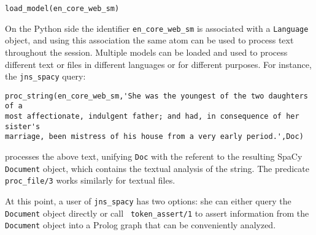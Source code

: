 \begin{verbatim}
load_model(en_core_web_sm) 
\end{verbatim}

\noindent
On the Python side the identifier {\tt en\_core\_web\_sm} is
associated with a {\tt Language} object, and using this
association the same atom can be used to process text throughout the
session.  Multiple models can be loaded and used to process different
text or files in different languages or for different purposes.  For
instance, the {\tt jns\_spacy} query:

\begin{verbatim}
proc_string(en_core_web_sm,'She was the youngest of the two daughters of a
most affectionate, indulgent father; and had, in consequence of her sister's
marriage, been mistress of his house from a very early period.',Doc)
\end{verbatim}

\noindent
processes the above text, unifying {\tt Doc} with the referent to
the resulting SpaCy {\tt Document} object, which contains the textual
analysis of the string.  The predicate {\tt proc\_file/3} works
similarly for textual files.

At this point, a user of {\tt jns\_spacy} has two options: she can
either query the {\tt Document} object directly or call {\tt
  token\_assert/1} to assert information from the {\tt Document}
object into a Prolog graph that can be conveniently analyzed.

%


